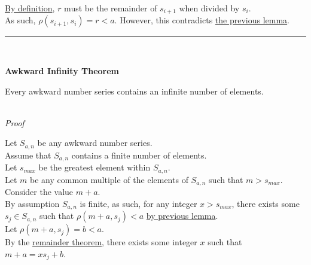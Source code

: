 \documentclass[a4paper,12pt]{article}
\begin{document}
\noindent \hyperlink{theorem:remainder_theorem}{By definition}, $r$ must be the remainder of $s_{i + 1}$ when divided by $s_i$.\\

\noindent As such, $\rho(s_{i + 1}, s_i) = r < a$. However, this contradicts \hyperlink{lemma:non_divisibility_of_elements}{the previous lemma}.

\begin{center}
\noindent\rule{8cm}{0.4pt}
\end{center}
\noindent \\






\label{theorem:infinite_asn}
\hypertarget{theorem:infinite_asn}{}
\begin{tcolorbox}
\textbf{Awkward Infinity Theorem}

Every awkward number series contains an infinite number of elements.
\end{tcolorbox}

\noindent \\
\textit{Proof}

\noindent Let $S_{a,n}$ be any awkward number series.\\

\noindent Assume that $S_{a,n}$ contains a finite number of elements.\\

\noindent Let $s_{max}$ be the greatest element within $S_{a, n}$.\\

\noindent Let $m$ be any common multiple of the elements of $S_{a, n}$ such that $m > s_{max}$.\\

\noindent Consider the value $m + a$.\\

\noindent By assumption $S_{a, n}$ is finite, as such, for any integer $x > s_{max}$, there exists some $s_j \in S_{a,n}$ such that $\rho(m + a, s_j) < a$ \hyperlink{lemma:exists_element_less_than_x}{by previous lemma}.\\

\noindent Let $\rho(m + a, s_j) = b < a$.\\

\noindent By the \hyperlink{theorem:remainder_theorem}{remainder theorem}, there exists some integer $x$ such that\\ $m + a = xs_j + b$.\\
\end{document}
